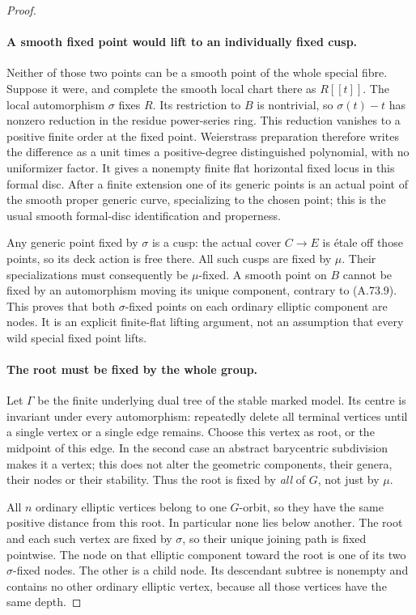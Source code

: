 \begin{proof}
\paragraph{A smooth fixed point would lift to an individually fixed cusp.}
Neither of those two points can be a smooth point of the
whole special fibre. Suppose it were, and complete the
smooth local chart there as \(R[[t]]\). The local
automorphism \(\sigma\) fixes \(R\). Its restriction
to \(B\) is nontrivial, so \(\sigma(t)-t\) has nonzero
reduction in the residue power-series ring. This reduction
vanishes to a positive finite order at the fixed point.
Weierstrass preparation therefore writes the difference
as a unit times a positive-degree distinguished polynomial,
with no uniformizer factor. It gives a nonempty finite flat
horizontal fixed locus in this formal disc.
\cite[Corollary 2.16]{fghVonk2021}
After a finite extension one of its generic points is an
actual point of the smooth proper generic curve, specializing
to the chosen point; this is the usual smooth formal-disc
identification and properness.

Any generic point fixed by \(\sigma\) is a cusp: the
actual cover \(C\to E\) is \'{e}tale off those points,
so its deck action is free there. All such cusps are fixed
by \(\mu\). Their specializations must consequently be
\(\mu\)-fixed. A smooth point on \(B\) cannot be fixed
by an automorphism moving its unique component, contrary
to (A.73.9). This proves that both \(\sigma\)-fixed
points on each ordinary elliptic component are nodes.
It is an explicit finite-flat lifting argument, not an
assumption that every wild special fixed point lifts.

\paragraph{The root must be fixed by the whole group.}
Let \(\Gamma\) be the finite underlying dual tree of
the stable marked model. Its centre is invariant under
every automorphism: repeatedly delete all terminal vertices
until a single vertex or a single edge remains. Choose
this vertex as root, or the midpoint of this edge. In the
second case an abstract barycentric subdivision makes it
a vertex; this does not alter the geometric components,
their genera, their nodes or their stability. Thus the
root is fixed by \emph{all} of \(G\), not just by
\(\mu\).

All \(n\) ordinary elliptic vertices belong to one
\(G\)-orbit, so they have the same positive distance
from this root. In particular none lies below another.
The root and each such vertex are fixed by \(\sigma\),
so their unique joining path is fixed pointwise. The node
on that elliptic component toward the root is one of its
two \(\sigma\)-fixed nodes. The other is a child node.
Its descendant subtree is nonempty and contains no other
ordinary elliptic vertex, because all those vertices have
the same depth.


\end{proof}

